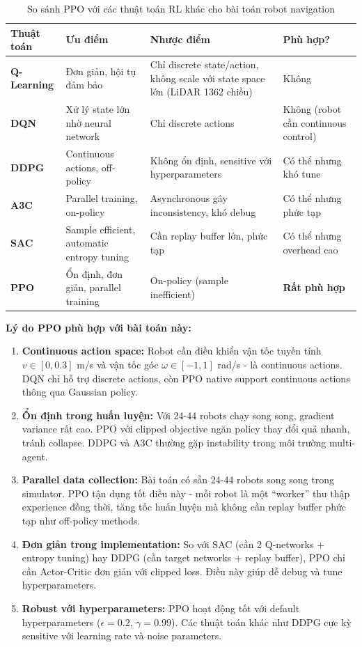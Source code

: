 \begin{table}[ht]
\centering
\caption{So sánh PPO với các thuật toán RL khác cho bài toán robot navigation}
\label{tab:rl_comparison}
\begin{tabular}{|p{2.2cm}|p{4cm}|p{4cm}|p{3.5cm}|}
\hline
\textbf{Thuật toán} & \textbf{Ưu điểm} & \textbf{Nhược điểm} & \textbf{Phù hợp?} \\
\hline
\textbf{Q-Learning} & Đơn giản, hội tụ đảm bảo & Chỉ discrete state/action, không scale với state space lớn (LiDAR 1362 chiều) & Không \\
\hline
\textbf{DQN} & Xử lý state lớn nhờ neural network & Chỉ discrete actions & Không (robot cần continuous control) \\
\hline
\textbf{DDPG} & Continuous actions, off-policy & Không ổn định, sensitive với hyperparameters & Có thể nhưng khó tune \\
\hline
\textbf{A3C} & Parallel training, on-policy & Asynchronous gây inconsistency, khó debug & Có thể nhưng phức tạp \\
\hline
\textbf{SAC} & Sample efficient, automatic entropy tuning & Cần replay buffer lớn, phức tạp & Có thể nhưng overhead cao \\
\hline
\textbf{PPO} & Ổn định, đơn giản, parallel training & On-policy (sample inefficient) & \textbf{Rất phù hợp} \\
\hline
\end{tabular}
\end{table}

\textbf{Lý do PPO phù hợp với bài toán này:}

\begin{enumerate}
\item \textbf{Continuous action space:} Robot cần điều khiển vận tốc tuyến tính $v \in [0, 0.3]$ m/s và vận tốc góc $\omega \in [-1, 1]$ rad/s - là continuous actions. DQN chỉ hỗ trợ discrete actions, còn PPO native support continuous actions thông qua Gaussian policy.

\item \textbf{Ổn định trong huấn luyện:} Với 24-44 robots chạy song song, gradient variance rất cao. PPO với clipped objective ngăn policy thay đổi quá nhanh, tránh collapse. DDPG và A3C thường gặp instability trong môi trường multi-agent.

\item \textbf{Parallel data collection:} Bài toán có sẵn 24-44 robots song song trong simulator. PPO tận dụng tốt điều này - mỗi robot là một ``worker'' thu thập experience đồng thời, tăng tốc huấn luyện mà không cần replay buffer phức tạp như off-policy methods.

\item \textbf{Đơn giản trong implementation:} So với SAC (cần 2 Q-networks + entropy tuning) hay DDPG (cần target networks + replay buffer), PPO chỉ cần Actor-Critic đơn giản với clipped loss. Điều này giúp dễ debug và tune hyperparameters.

\item \textbf{Robust với hyperparameters:} PPO hoạt động tốt với default hyperparameters ($\epsilon = 0.2$, $\gamma = 0.99$). Các thuật toán khác như DDPG cực kỳ sensitive với learning rate và noise parameters.
\end{enumerate}

